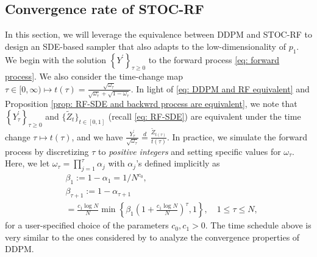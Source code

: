 \documentclass{article}
\theoremstyle{plain}
\theoremstyle{definition}
\theoremstyle{remark}
\newcommand{\bc}[1]{\left\{{#1}\right\}}
\newcommand{\br}[1]{\left({#1}\right)}
\begin{document}
\subsection{Convergence rate of STOC-RF}
In this section, we will leverage the equivalence between DDPM and STOC-RF to design an SDE-based sampler that also adapts to the low-dimensionality of $p_1$. We begin with the solution $\bc{Y^\prime}_{\tau\ge 0}$ to the forward process \eqref{eq: forward process}. %
We also consider the time-change map
$
\tau \in [0, \infty) \mapsto t(\tau) = \frac{\sqrt{\omega_\tau}}{\sqrt{\omega_\tau} + \sqrt{1 - \omega_\tau}}.
$
In light of \eqref{eq: DDPM and RF equivalent} and Proposition \ref{prop: RF-SDE and backwrd process are equivalent}, we note that $\bc{Y^\prime_\tau}_{\tau \ge 0}$ and $\{\tilde Z_t\}_{t \in [0,1]}$ (recall \ref{eq: RF-SDE}) are equivalent under the time change $\tau \mapsto t(\tau)$, and we have $\frac{Y^\prime_\tau}{\sqrt{\omega_\tau}} \overset{d}{=} \frac{\tilde Z_{t(\tau)}}{t(\tau)}$. %
In practice, we simulate the forward process by discretizing $\tau$ to \textit{positive integers} and setting specific values for $\omega_\tau$. Here, we let $\omega_\tau = \prod_{j =1}^\tau \alpha_j$ with $\alpha_j$'s defined implicitly as 
\begin{equation}
    \label{eq: DDPM time scheduling}
    \begin{aligned}
        & \beta_1 := 1 - \alpha_1 = 1/N^{c_0},\\
        & \beta_{\tau+1} := 1 - \alpha_{\tau+1}\\
        &  = \frac{c_1 \log N}{N} \min \bc{\beta_1 \br{1 + \frac{c_1 \log N}{N}}^\tau, 1}, \quad 1 \le \tau \le N,
    \end{aligned}
\end{equation}
for a user-specified choice of the parameters $c_0, c_1 >0$.
The time schedule above is very similar to the ones considered by \citet{potaptchik2024linear, li2024sharp, li2024adapting, huang2024denoising,liang2025low} to analyze the convergence properties of DDPM. 
\end{document}
